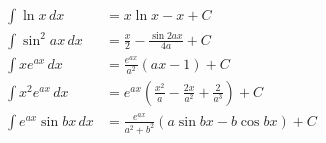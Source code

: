 \begin{align*}
  \int \ln x \,dx &= x\ln x - x + C \\
  \int \sin^2 ax \,dx &= \frac{x}{2} - \frac{\sin 2ax}{4a} +C\\
  \int xe^{ax} \,dx &= \frac{e^{ax}}{a^2} (ax - 1) +C \\
  \int x^2 e^{ax} \,dx &= e^{ax}\left(\frac{x^2}{a} - \frac{2x}{a^2} + \frac{2}{a^3}\right) +C \\
  \int e^{ax} \sin bx \,dx &= \frac{e^{ax}}{a^2 + b^2} (a\sin bx - b\cos bx) +C
\end{align*}
